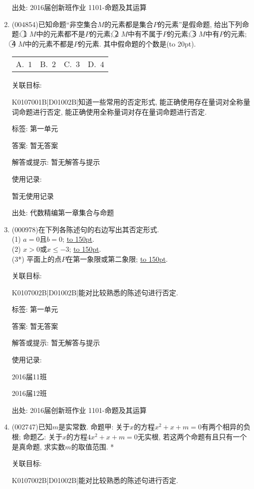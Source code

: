 \documentclass[10pt,a4paper]{article}
\newcommand{\blank}[1]{\underline{\hbox to #1pt{}}}
\newcommand{\bracket}[1]{(\hbox to #1pt{})}
\newcommand{\fourch}[4]{\par\begin{tabular}{p{.23\textwidth}p{.23\textwidth}p{.23\textwidth}p{.23\textwidth}}
A.~#1 &B.~#2& C.~#3& D.~#4
\end{tabular}}
\begin{document}
\begin{enumerate}[1.]
出处: 2016届创新班作业	1101-命题及其运算
\item { (004854)}已知命题``非空集合$M$的元素都是集合$P$的元素''是假命题, 给出下列命题: \textcircled{1} $M$中的元素都不是$P$的元素; \textcircled{2} $M$中有不属于$P$的元素; \textcircled{3} $M$中有$P$的元素; \textcircled{4} $M$中的元素不都是$P$的元素. 其中假命题的个数是\bracket{20}.
\fourch{$1$}{$2$}{$3$}{$4$}


关联目标:

K0107001B|D01002B|知道一些常用的否定形式, 能正确使用存在量词对全称量词命题进行否定, 能正确使用全称量词对存在量词命题进行否定.



标签: 第一单元

答案: 暂无答案

解答或提示: 暂无解答与提示

使用记录:

暂无使用记录


出处: 代数精编第一章集合与命题
\item { (000978)}在下列各陈述句的右边写出其否定形式.\\ 
(1) $a=0$且$b=0$; \blank{150}.\\ 
(2) $x>0$或$x \le -3$; \blank{150}.\\ 
(3*) 平面上的点$P$在第一象限或第二象限; \blank{150}.


关联目标:

K0107002B|D01002B|能对比较熟悉的陈述句进行否定.



标签: 第一单元

答案: 暂无答案

解答或提示: 暂无解答与提示

使用记录:

2016届11班			

2016届12班			


出处: 2016届创新班作业	1101-命题及其运算
\item { (002747)}已知$m$是实常数. 命题甲: 关于$x$的方程$x^2+x+m=0$有两个相异的负根; 命题乙: 关于$x$的方程$4x^2+x+m=0$无实根, 若这两个命题有且只有一个是真命题, 求实数$m$的取值范围.
*


关联目标:

K0107002B|D01002B|能对比较熟悉的陈述句进行否定.




\end{enumerate}
\end{document}
